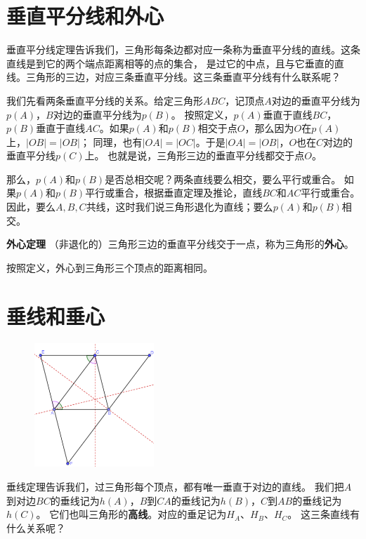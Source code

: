 \documentclass[12pt,UTF8]{ctexbook}
\begin{document}
\section{垂直平分线和外心}
垂直平分线定理告诉我们，三角形每条边都对应一条称为垂直平分线的直线。这条直线是到它的两个端点距离相等的点的集合，
是过它的中点，且与它垂直的直线。三角形的三边，对应三条垂直平分线。这三条垂直平分线有什么联系呢？

我们先看两条垂直平分线的关系。给定三角形$ABC$，记顶点$A$对边的垂直平分线为$p(A)$，$B$对边的垂直平分线为$p(B)$。
按照定义，$p(A)$垂直于直线$BC$，$p(B)$垂直于直线$AC$。如果$p(A)$和$p(B)$相交于点$O$，那么因为$O$在$p(A)$上，$|OB| = |OB|$；
同理，也有$|OA| = |OC|$。于是$|OA| = |OB|$，$O$也在$C$对边的垂直平分线$p(C)$上。
也就是说，三角形三边的垂直平分线都交于点$O$。

那么，$p(A)$和$p(B)$是否总相交呢？两条直线要么相交，要么平行或重合。
如果$p(A)$和$p(B)$平行或重合，根据垂直定理及推论，直线$BC$和$AC$平行或重合。
因此，要么$A,B,C$共线，这时我们说三角形退化为直线；要么$p(A)$和$p(B)$相交。
\begin{tm}{\textbf{外心定理}}\label{tm:1-0-0}
    （非退化的）三角形三边的垂直平分线交于一点，称为三角形的\textbf{外心}。
\end{tm}
按照定义，外心到三角形三个顶点的距离相同。

\section{垂线和垂心}

\begin{figure} %
    \vspace{-45pt}
    \flushright
    \includegraphics[width=0.4\textwidth]{tu/三角形7.png}
\end{figure}

垂线定理告诉我们，过三角形每个顶点，都有唯一垂直于对边的直线。
我们把$A$到对边$BC$的垂线记为$h(A)$，$B$到$CA$的垂线记为$h(B)$，$C$到$AB$的垂线记为$h(C)$。
它们也叫三角形的\textbf{高线}。对应的垂足记为$H_A$、$H_B$、$H_C$。
这三条直线有什么关系呢？
\end{document}
